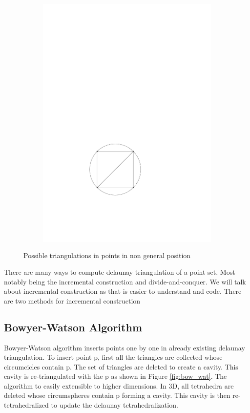 \begin{figure}[h]
\begin{subfigure}[t]{0.5\textwidth}
        \includegraphics{images/non_general_pos_b.pdf}
    \end{subfigure}
    \caption{Possible triangulations in points in non general position}
    \label{fig:non_general_pos}
\end{figure}

There are many ways to compute delaunay triangulation of a point set. Most notably being the incremental construction and divide-and-conquer. We will talk about incremental construction as that is easier to understand and code. There are two methods for incremental construction

\subsection{Bowyer-Watson Algorithm}
Bowyer-Watson algorithm \cite{bowyer,watson} inserts points one by one in already existing delaunay triangulation. To insert point p, first all the triangles are collected whose circumcicles contain p. The set of triangles are deleted to create a cavity. This cavity is re-triangulated with the p as shown in Figure \ref{fig:bow_wat}. The algorithm to easily extensible to higher dimensions. In 3D, all tetrahedra are deleted whose circumspheres contain p forming a cavity. This cavity is then re-tetrahedralized to update the delaunay tetrahedralization. 

